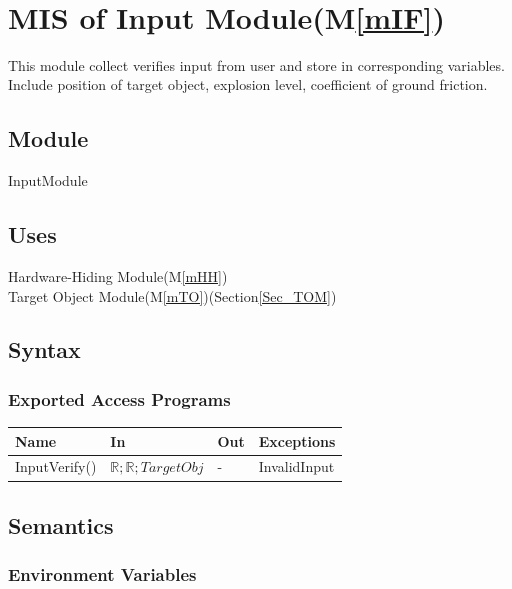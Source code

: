 \documentclass[12pt, titlepage]{article}
\newcommand{\mref}[1]{M\ref{#1}}
\begin{document}
~\newpage

\section{MIS of Input Module(\mref{mIF})} 
\label{Sec_MIM}

This module collect verifies input from user and store in corresponding variables. Include position of target object, explosion level, coefficient of ground friction.

\subsection{Module}

InputModule

\subsection{Uses}

Hardware-Hiding Module(\mref{mHH})\\
Target Object Module(\mref{mTO})(Section\ref{Sec_TOM})

\subsection{Syntax}

\subsubsection{Exported Access Programs}

\begin{center}
\begin{tabular}{p{3cm} p{4cm} p{4cm} p{2cm}}
\hline
\textbf{Name} & \textbf{In} & \textbf{Out} & \textbf{Exceptions} \\
\hline
InputVerify() &  $\mathbb{R}; \mathbb{R}; TargetObj$ & - & InvalidInput\\
\hline
\end{tabular}
\end{center}

\subsection{Semantics}

\subsubsection{Environment Variables}
\end{document}
